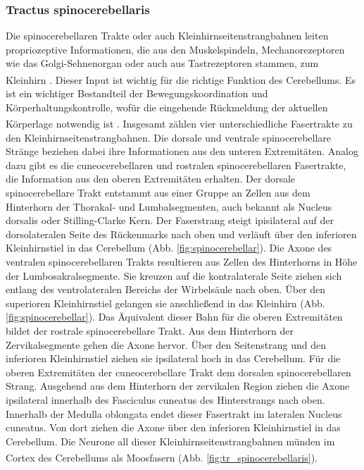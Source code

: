 \documentclass[12pt,a4paper,pdftex]{article}
\begin{document}
\subsubsection{Tractus spinocerebellaris} 
Die spinocerebellaren Trakte  oder auch Kleinhirnseitenstrangbahnen leiten propriozeptive Informationen, die aus den Muskelspindeln, Mechanorezeptoren wie das Golgi-Sehnenorgan oder auch aus Tastrezeptoren stammen, zum Kleinhirn \textsuperscript{\cite[8]{crossman2014neuroanatomy}}. Dieser Input ist wichtig für die richtige Funktion des Cerebellums. Es ist ein wichtiger Bestandteil der Bewegungskoordination und Körperhaltungskontrolle, wofür die eingehende Rückmeldung der aktuellen Körperlage notwendig ist \textsuperscript{\cite[3]{trepel2011neuroanatomie}}. Insgesamt zählen vier unterschiedliche Fasertrakte zu den Kleinhirnseitenstrangbahnen. Die dorsale und ventrale spinocerebellare Stränge beziehen dabei ihre Informationen aus den unteren Extremitäten. Analog dazu gibt es die cuneocerebellaren und rostralen spinocerebellaren Fasertrakte, die Information aus den oberen Extremitäten erhalten. Der dorsale spinocerebellare Trakt entstammt aus einer Gruppe an Zellen aus dem Hinterhorn der Thorakal- und Lumbalsegmenten, auch bekannt als Nucleus dorsalis oder Stilling-Clarke Kern. Der Faserstrang steigt ipisilateral auf der dorsolateralen Seite des Rückenmarks nach oben und verläuft über den inferioren Kleinhirnstiel in das Cerebellum (Abb. \ref{fig:spinocerebellar}). Die Axone des ventralen spinocerebellaren Trakts resultieren aus Zellen des Hinterhorns in Höhe der Lumbosakralsegmente. Sie kreuzen auf die kontralaterale Seite ziehen sich entlang des ventrolateralen Bereichs der Wirbelsäule nach oben. Über den superioren Kleinhirnstiel gelangen sie anschließend in das Kleinhirn (Abb. \ref{fig:spinocerebellar}). Das Äquivalent dieser Bahn für die oberen Extremitäten bildet der rostrale spinocerebellare Trakt. Aus dem Hinterhorn der Zervikalsegmente gehen die Axone hervor. Über den Seitenstrang und den inferioren Kleinhirnstiel ziehen sie ipsilateral hoch in das Cerebellum. Für die oberen Extremitäten der cuneocerebellare Trakt dem dorsalen spinocerebellaren Strang. Ausgehend aus dem Hinterhorn der zervikalen Region ziehen die Axone ipsilateral innerhalb des Fasciculus cuneatus des Hinterstrangs nach oben. Innerhalb der Medulla oblongata endet dieser Fasertrakt im lateralen Nucleus cuneatus. Von dort ziehen die Axone über den inferioren Kleinhirnstiel in das Cerebellum. Die Neurone all dieser Kleinhirnseitenstrangbahnen münden im Cortex des Cerebellums als Moosfasern \textsuperscript{\cite[8]{crossman2014neuroanatomy}} (Abb. \ref{fig:tr_spinocerebellaris}).          
\end{document}
